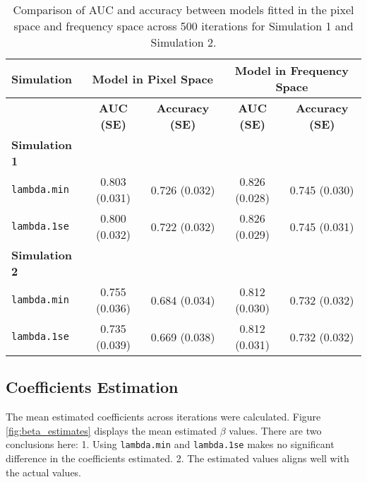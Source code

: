 \documentclass[12pt]{article}
\begin{document}
\begin{table}[h!]
	\centering
	\caption{Comparison of AUC and accuracy between models fitted in the pixel space and frequency space across 500 iterations for Simulation 1 and Simulation 2.}
	\label{tab:auc_acc_table}
	\begin{tabular}{l|cc|cc}
		\toprule
		\textbf{Simulation}   & \multicolumn{2}{c}{\textbf{Model in Pixel Space}} & \multicolumn{2}{c}{\textbf{Model in Frequency Space}}                                              \\
		\midrule
		                      & \textbf{AUC (SE)}                                 & \textbf{Accuracy (SE)}                                & \textbf{AUC (SE)} & \textbf{Accuracy (SE)} \\
		\midrule
		\textbf{Simulation 1} &                                                   &                                                       &                   &                        \\
    \texttt{lambda.min}            & 0.803 (0.031)                                     & 0.726 (0.032)                                         & 0.826 (0.028)     & 0.745 (0.030)          \\
      \texttt{lambda.1se}            & 0.800 (0.032)                                     & 0.722 (0.032)                                         & 0.826 (0.029)     & 0.745 (0.031)          \\
		\midrule
		\textbf{Simulation 2} &                                                   &                                                       &                   &                        \\
    \texttt{lambda.min}            & 0.755 (0.036)                                     & 0.684 (0.034)                                         & 0.812 (0.030)     & 0.732 (0.032)          \\
      \texttt{lambda.1se}            & 0.735 (0.039)                                     & 0.669 (0.038)                                         & 0.812 (0.031)     & 0.732 (0.032)          \\
		\bottomrule
	\end{tabular}
\end{table}

\subsection*{Coefficients Estimation}

The mean estimated coefficients across iterations were calculated. Figure \ref{fig:beta_estimates} displays the mean estimated \( \beta \) values. There are two conclusions here: 1. Using \texttt{lambda.min} and \texttt{lambda.1se} makes no significant difference in the coefficients estimated. 2. The estimated values aligns well with the actual values.
\end{document}
